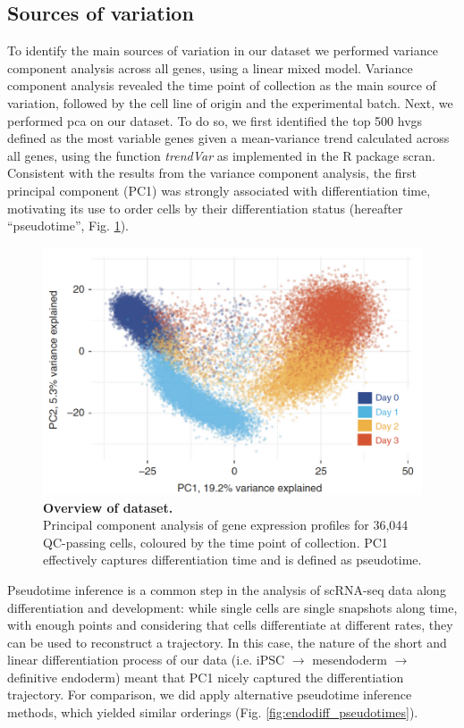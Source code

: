 \subsection{Sources of variation} 

To identify the main sources of variation in our dataset we performed variance component analysis across all genes, using a linear mixed model.
Variance component analysis revealed the time point of collection as the main source of variation, followed by the cell line of origin and the experimental batch. 
Next, we performed \gls{pca} on our dataset.
To do so, we first identified the top 500 \gls{hvgs} defined as the most variable genes given a mean-variance trend calculated across all genes, using the function \textit{trendVar} as implemented in the R package scran.
Consistent with the results from the variance component analysis, the first principal component (PC1) was strongly associated with differentiation time, motivating its use to order cells by their differentiation status (hereafter “pseudotime”, Fig. \ref{fig:endodiff_pca}).\\

\begin{figure}[h]
\centering
\includegraphics[width=14cm]{Chapter4/Fig/endodiff_pca_overview.png}
\caption[Overview of dataset.]{\textbf{Overview of dataset.}\\
Principal component analysis of gene expression profiles for 36,044 QC-passing
cells, coloured by the time point of collection.
PC1 effectively captures differentiation time and is defined as pseudotime.}
\label{fig:endodiff_pca}
\end{figure}

Pseudotime inference is a common step in the analysis of scRNA-seq data along differentiation and development: while single cells are single snapshots along time, with enough points and considering that cells differentiate at different rates, they can be used to reconstruct a trajectory.
In this case, the nature of the short and linear differentiation process of our data (i.e. iPSC $\rightarrow$ mesendoderm $\rightarrow$ definitive endoderm) meant that PC1 nicely captured the differentiation trajectory.
For comparison, we did apply alternative pseudotime inference methods, which yielded similar orderings (Fig. \ref{fig:endodiff_pseudotimes}).


